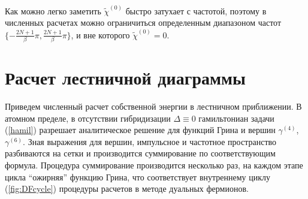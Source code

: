 \documentclass[11pt,a4paper]{report}
\begin{document}
Как можно легко заметить $\tilde{\chi}^{(0)}$ быстро затухает с частотой, поэтому в численных расчетах можно ограничиться определенным диапазоном частот $\{-\frac{2N+1}{\beta}\pi,\frac{2N+1}{\beta}\pi\}$, и вне которого $\tilde{\chi}^{(0)} = 0$.

\section{Расчет лестничной диаграммы}

Приведем численный расчет собственной энергии в лестничном приближении.
В атомном пределе, в отсутствии гибридизации $\Delta\equiv 0$ гамильтониан задачи (\ref{hamil}) разрешает аналитическое решение для функций Грина и вершин $\gamma^{(4)}$,$\gamma^{(6)}$. 
Зная выражения для вершин, импульсное и частотное пространство разбиваются на сетки и производится суммирование по соответствующим формула.
Процедура суммирование производится несколько раз, на каждом этапе цикла ``ожирняя'' функцию Грина, что соответствует внутреннему циклу (\ref{fig:DFcycle}) процедуры расчетов в методе дуальных фермионов.
\end{document}
